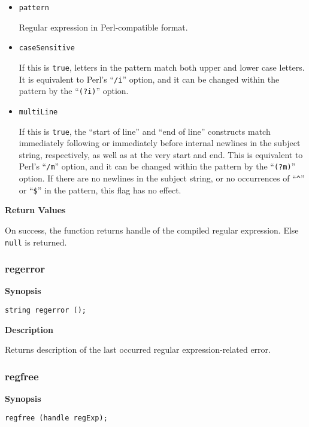 \documentclass[a4paper, 10pt, titlepage]{article}
\begin{document}
\begin{itemize}
\item \texttt{pattern}

Regular expression in Perl-compatible format.

\item \texttt{caseSensitive}

If this is \texttt{true}, letters in the pattern match both upper and lower case letters. It is equivalent to Perl's ``\texttt{/i}'' option, and it can be changed within the pattern by the ``\texttt{(?i)}'' option.

\item \texttt{multiLine}

If this is \texttt{true}, the ``start of line'' and ``end of line'' constructs match immediately following or immediately before internal newlines in the subject string, respectively, as well as at the very start and end. This is equivalent to Perl's ``\texttt{/m}'' option, and it can be changed within the pattern by the ``\texttt{(?m)}'' option. If there are no newlines in the subject string, or no occurrences of ``\texttt{\textasciicircum}'' or ``\texttt{\$}'' in the pattern, this flag has no effect.
\end{itemize}

\textbf{Return Values}

On success, the function returns handle of the compiled regular expression. Else \texttt{null} is returned.

\subsubsection{regerror}

\textbf{Synopsis}

\begin{verbatim}
string regerror ();
\end{verbatim}

\textbf{Description}

Returns description of the last occurred regular expression-related error.

\subsubsection{regfree}

\textbf{Synopsis}

\begin{verbatim}
regfree (handle regExp);
\end{verbatim}
\end{document}
